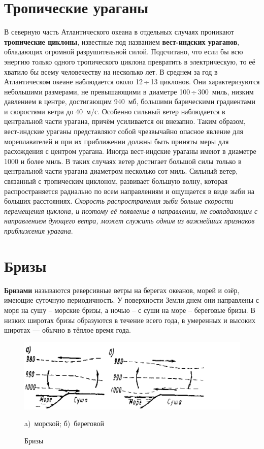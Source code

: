\documentclass[a4paper, 12pt, twoside, final, book, russian, fittopage, cyremdash, openright]{ncc}
\newcommand{\mps}{~м/с\xspace}
\newcommand{\otdo}{\,\ensuremath{\div}\,}
\begin{document}
\section{Тропические ураганы}
\label{sec:hurricans}

В северную часть Атлантического океана в отдельных случаях проникают
\textbf{тропические циклоны}, известные под
названием \textbf{вест-индских ураганов},
обладающих огромной разрушительной силой. Подсчитано, что если бы всю
энергию только одного тропического циклона превратить в электрическую,
то её хватило бы всему человечеству на несколько лет. В среднем за год
в Атлантическом океане наблюдается около 12\otdo{}13 циклонов. Они
характеризуются небольшими размерами, не превышающими в диаметре
100\otdo{}300~миль, низким давлением в центре, достигающим 940~мб,
большими барическими градиентами и скоростями ветра до
40\mps{}. Особенно сильный ветер наблюдается в центральной части
урагана, причём усиливается он внезапно. Таким образом, вест-индские
ураганы представляют собой чрезвычайно опасное явление для
мореплавателей и при их приближении должны быть приняты меры для
расхождения с центром урагана.  Иногда вест-индские ураганы имеют в
диаметре 1000 и более миль. В таких случаях ветер достигает большой
силы только в центральной части урагана диаметром несколько сот
миль. Сильный ветер, связанный с тропическим циклоном, развивает
большую волну, которая распространяется радиально по всем направлениям
и ощущается в виде зыби на больших расстояниях. \textit{Скорость
  распространения зыби больше скорости перемещения циклона, и поэтому
  её появление в направлении, не совпадающим с направлением дующего
  ветра, может служить одним из важнейших признаков приближения
  урагана}.

\section{Бризы}
\label{sec:breeze}

\textbf{Бризами} называются реверсивные ветры на берегах
океанов, морей и озёр, имеющие суточную периодичность. У поверхности
Земли днем они направлены с моря на сушу \--- морские бризы, а ночью
\--- с суши на море \--- береговые бризы. В низких широтах бризы
образуются в течение всего года, в умеренных и высоких широтах —
обычно в тёплое время года.

\begin{figure}[htb]
   \centering
   \includegraphics[scale=0.2]{01_breeze.png}
   \caption{Бризы}
   \label{fig:01_breeze}
   \centering{}
   \small
   a)~морской; б)~береговой
\end{figure}
\end{document}
